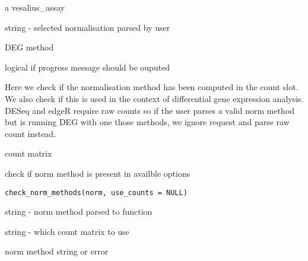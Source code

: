 \documentclass[a4paper]{book}
\begin{document}
%
\begin{Arguments}
\begin{ldescription}
\item[\code{vesalius\_assay}] a vesalius\_assay

\item[\code{norm\_method}] string - selected normalisation parsed by user

\item[\code{method}] DEG method

\item[\code{verbose}] logical if progress message should be ouputed
\end{ldescription}
\end{Arguments}
%
\begin{Details}
Here we check if the normalisation method has been computed in
the count slot. We also check if this is used in the context of
differential gene expression analysis. DESeq and edgeR require raw counts
so if the user parses a valid norm method but is running DEG with one
those methods, we ignore request and parse raw count instead.
\end{Details}
%
\begin{Value}
count matrix
\end{Value}
%
\begin{Description}
check if norm method is present in availble options
\end{Description}
%
\begin{Usage}
\begin{verbatim}
check_norm_methods(norm, use_counts = NULL)
\end{verbatim}
\end{Usage}
%
\begin{Arguments}
\begin{ldescription}
\item[\code{norm}] string - norm method parsed to function

\item[\code{use\_counts}] string - which count matrix to use
\end{ldescription}
\end{Arguments}
%
\begin{Value}
norm method string or error
\end{Value}
%
\end{document}
